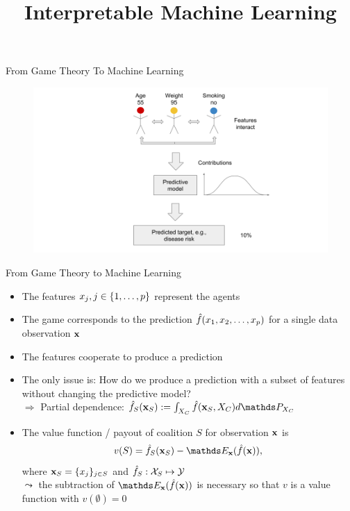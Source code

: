 \documentclass[11pt,compress,t,notes=noshow, aspectratio=169, xcolor=table]{beamer}
\title{Interpretable Machine Learning}
\date{}
\begin{document}
\newcommand{\titlefigure}{figure_man/bike-sharing03.png}
\newcommand{\learninggoals}{
\item See model predictions as a cooperative game
\item Transfer the Shapley value concept from game theory to machine learning
}



\begin{vbframe}{From Game Theory To Machine Learning}

\begin{figure}
    \centering
    \includegraphics{figure/Shapley_6.png}
\end{figure}

\end{vbframe}

\begin{vbframe}{From Game Theory to Machine Learning}
\begin{itemize}
    \itemsep1em
    \item The features $x_j, j \in \pset$ represent the agents
    \item The game corresponds to the prediction $\fh(x_1, x_2, \ldots, x_p)$ for a single data observation $\xv$
    \item The features cooperate to produce a prediction
    \item The only issue is: How do we produce a prediction with a subset of features without changing the predictive model?
    \\ $\Rightarrow$ Partial dependence: $\fh_{S}(\xv_S) := \int_{X_C} \fh(\xv_S, X_C)d \P_{X_C}$
    \item  The value function / payout of coalition $S$ for observation $\xv$ is
    $$v(S) =  \fh_{S} (\xv_S) - \E_{\xv}(\fh(\xv)),$$ 
    where $\xv_S = \{x_j\}_{j \in S}$ and $\fh_S: \Xspace_S \mapsto \Yspace$ \\ $\leadsto$ the subtraction of $\E_{\xv}(\fh(\xv))$ is necessary so that $v$ is a value function with $v(\emptyset) = 0$
\end{itemize}
\end{vbframe}
\end{document}
